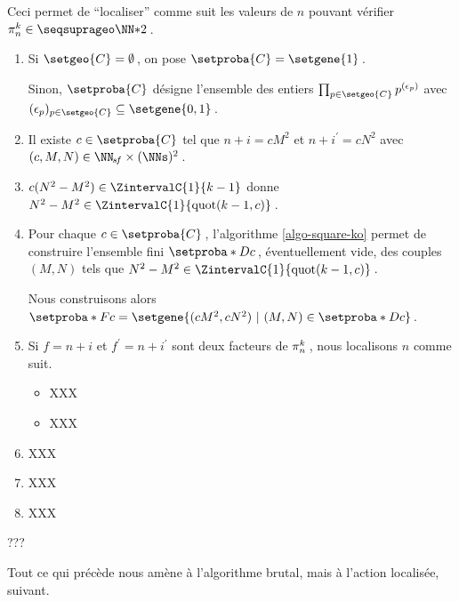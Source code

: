 Ceci permet de \enquote{localiser} comme suit les valeurs de $n$ pouvant vérifier $\consprod \in \NNssquare$\,.
%
\begin{enumerate}
	\item Si $\setgeo{C} = \emptyset$\,, on pose $\setproba{C} = \setgene{1}$\,. 
	
	\noindent
	Sinon, $\setproba{C}$ désigne l'ensemble des entiers $\prod_{p \in \setgeo{C}} p^{(\epsilon_p)}$ avec $(\epsilon_p)_{p \in \setgeo{C}} \subseteq \setgene{0, 1}$\,.


	\item Il existe $c \in \setproba{C}$ tel que $n+i = c M^2$ et $n+i^\prime = c N^2$ avec $(c, M, N) \in \NNsf \times ( \NNs )^2$\,.
	


	\item $c ( N^2 - M^2 ) \in \ZintervalC{1}{k-1}$ donne $N^2 - M^2 \in \ZintervalC{1}{\quot{k-1}{c}}$\,.


	\item Pour chaque $c \in \setproba{C}$\,, l'algorithme \ref{algo-square-ko} permet de construire l'ensemble fini $\setproba*{D}{c}$\,, éventuellement vide, des couples $(M, N)$ tels que $N^2 - M^2 \in \ZintervalC{1}{\quot{k-1}{c}}$\,.
	
	\noindent
	Nous construisons alors
	$\setproba*{F}{c} = \setgene{ (c M^2, c N^2) \,\, | \,\, (M, N) \in \setproba*{D}{c} }$\,.
	


	\item Si $f = n + i$ et $f^\prime = n + i^\prime$ sont deux facteurs de $\consprod$\,, nous localisons $n$ comme suit.
	\begin{itemize}
		\item XXX

		\item XXX
	\end{itemize}


	\item XXX


	\item XXX


	\item XXX
\end{enumerate}






???








\medskip

Tout ce qui précède nous amène à l'algorithme brutal, mais à l'action localisée, suivant.

{\small
\begin{algo}[frame] \label{algo-kill}
	\BlankLine
\end{algo}
}